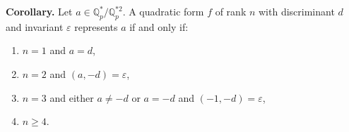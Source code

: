 \textbf{Corollary.} Let $a \in \mathbb{Q}_p^*/\mathbb{Q}_p^{*2}$. A quadratic form $f$ of rank $n$ with discriminant $d$ and invariant $\varepsilon$ represents $a$ if and only if:
\begin{enumerate}
\item[(i)] $n = 1$ and $a = d$,
\item[(ii)] $n = 2$ and $(a, -d) = \varepsilon$,
\item[(iii)] $n = 3$ and either $a \neq -d$ or $a = -d$ and $(-1, -d) = \varepsilon$,
\item[(iv)] $n \geq 4$.
\end{enumerate}
